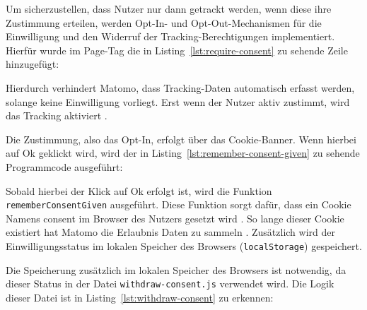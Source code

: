 Um sicherzustellen, dass Nutzer nur dann getrackt werden, wenn diese ihre Zustimmung erteilen, werden Opt-In- und Opt-Out-Mechanismen für die Einwilligung und den Widerruf der Tracking-Berechtigungen implementiert. Hierfür wurde im Page-Tag die in Listing~\ref{lst:require-consent} zu sehende Zeile hinzugefügt: 

\begin{figure}[H]
    \centering
    \begin{minipage}{\textwidth}
        
    \end{minipage}
\end{figure}

Hierdurch verhindert Matomo, dass Tracking-Daten automatisch erfasst werden, solange keine Einwilligung vorliegt. Erst wenn der Nutzer aktiv zustimmt, wird das Tracking aktiviert \parencite{MatomoConsent}.

Die Zustimmung, also das Opt-In, erfolgt über das Cookie-Banner. Wenn hierbei auf \glqq Ok\grqq{} geklickt wird, wird der in Listing~\ref{lst:remember-consent-given} zu sehende Programmcode ausgeführt:

\begin{figure}[H]
    \centering
    \begin{minipage}{\textwidth}
        
    \end{minipage}
\end{figure}

Sobald hierbei der Klick auf \glqq Ok\grqq{} erfolgt ist, wird die Funktion \texttt{rememberConsentGiven} ausgeführt. Diese Funktion sorgt dafür, dass ein Cookie Namens \glqq consent\grqq{} im Browser des Nutzers gesetzt wird \parencite{MatomoConsent}. So lange dieser Cookie existiert hat Matomo die Erlaubnis Daten zu sammeln \parencite{MatomoConsent}. Zusätzlich wird der Einwilligungsstatus im lokalen Speicher des Browsers (\texttt{localStorage}) gespeichert.

Die Speicherung zusätzlich im lokalen Speicher des Browsers ist notwendig, da dieser Status in der Datei \texttt{withdraw-consent.js} verwendet wird. Die Logik dieser Datei ist in Listing~\ref{lst:withdraw-consent} zu erkennen: 

